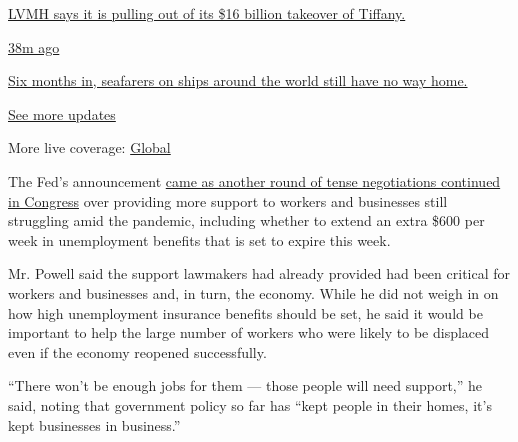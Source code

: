 \href{https://www.nytimes3xbfgragh.onion/live/2020/09/09/business/stock-market-today-coronavirus?action=click\&pgtype=Article\&state=default\&region=MAIN_CONTENT_1\&context=storylines_live_updates\#lvmh-says-it-is-pulling-out-of-its-16-billion-takeover-of-tiffany}{LVMH
says it is pulling out of its \$16 billion takeover of Tiffany.}

\href{https://www.nytimes3xbfgragh.onion/live/2020/09/09/business/stock-market-today-coronavirus?action=click\&pgtype=Article\&state=default\&region=MAIN_CONTENT_1\&context=storylines_live_updates\#six-months-in-seafarers-on-ships-around-the-world-still-have-no-way-home}{38m
ago}

\href{https://www.nytimes3xbfgragh.onion/live/2020/09/09/business/stock-market-today-coronavirus?action=click\&pgtype=Article\&state=default\&region=MAIN_CONTENT_1\&context=storylines_live_updates\#six-months-in-seafarers-on-ships-around-the-world-still-have-no-way-home}{Six
months in, seafarers on ships around the world still have no way home.}

\href{https://www.nytimes3xbfgragh.onion/live/2020/09/09/business/stock-market-today-coronavirus?action=click\&pgtype=Article\&state=default\&region=MAIN_CONTENT_1\&context=storylines_live_updates}{See
more updates}

More live coverage:
\href{https://www.nytimes3xbfgragh.onion/2020/09/09/world/covid-19-coronavirus.html?action=click\&pgtype=Article\&state=default\&region=MAIN_CONTENT_1\&context=storylines_live_updates}{Global}

The Fed's announcement
\href{https://www.nytimes3xbfgragh.onion/2020/07/28/business/us-lawmakers-deliberate-over-another-aid-package.html}{came
as another round of tense negotiations continued in Congress} over
providing more support to workers and businesses still struggling amid
the pandemic, including whether to extend an extra \$600 per week in
unemployment benefits that is set to expire this week.

Mr. Powell said the support lawmakers had already provided had been
critical for workers and businesses and, in turn, the economy. While he
did not weigh in on how high unemployment insurance benefits should be
set, he said it would be important to help the large number of workers
who were likely to be displaced even if the economy reopened
successfully.

``There won't be enough jobs for them --- those people will need
support,'' he said, noting that government policy so far has ``kept
people in their homes, it's kept businesses in business.''

